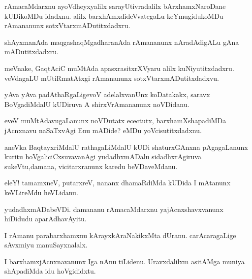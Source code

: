 \documentclass{article}
\begin{document}
\begin{mn}%
rAmacaMdarxnu ayoVdheyxyalilx sarayUtivradalilx bArxhamxNaroDane kUDikoMDu idadxnu. alilx 
barxhAmxdideVvategaLu keYmugidukoMDu rAmananunx sotxVtarxmADutitxdadxru.
\end{mn}

\begin{mn}%
shAyxmanAda maqgashaqMgadharanAda rAmananunx nAradAdigALu gAna mADutitxdadxru.
\end{mn}

\begin{mn}%
meVnake, GaqtAciC muMtAda apasxrasitxrXVyaru alilx kuNiyutitxdadxru. veVdagaLU 
mUtiRmatAtxgi rAmananunx sotxVtarxmADutitxdadxvu.
\end{mn}

\begin{mn}%
yAva yAva padAthaRgaLigevoV adelalxvanUnx koDatakakx, saravx BoVgadiMdalU kUDiruva A 
shirxVrAmananunx noVDidanu.
\end{mn}

\begin{mn}%
eveV muMtAdavugaLanunx noVDutatx ecectutx, barxhamXshapadiMDa jAcnxnavu naSaTxvAgi Enu 
mADide? eMDu yoVcisutitxdadxnu.
\end{mn}

\begin{mn}%
aneVka BaqtayxriMdalU rathagaLiMdalU kUDi shaturxGAnxna pAgagaLanunx kuritu 
hoVgaliciCxsuvavanAgi yudadhxmADalu sidadhxrAgiruva sukeVtu,damana, vicitarxranunx karedu 
beVDaveMdanu.
\end{mn}

\begin{mn}%
eleY! tamamxneV, putarxreV, nananx dhamaRdiMda kUDida I mAtanunx keVLireMdu heVLidanu.
\end{mn}

\begin{mn}%
yudadhxmADabeVDi. damananu rAmacaMdarxnu yajAcnxshavxvanunx hiDidudu aparAdhavAyitu.
\end{mn}

\begin{mn}%
I rAmanu parabarxhamxnu kArayxkAraNakikxMta dUranu. carAcaragaLige sAvxmiyu manuSayxnalalx.
\end{mn}

\begin{mn}%
I barxhamxjAcnxnavanunx Iga nAnu tiLidenu. Uravxdalilxm asitAMga muniya shApadiMda idu 
hoVgididxtu.
\end{mn}
\end{document}
